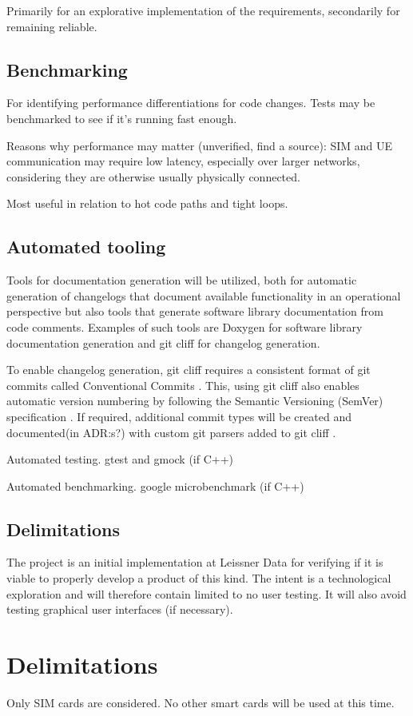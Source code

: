 Primarily for an explorative implementation of the requirements,
secondarily for remaining reliable.

\subsection{Benchmarking}

For identifying performance differentiations for code changes.
Tests may be benchmarked to see if it's running fast enough.

Reasons why performance may matter (unverified, find a source):
SIM and UE communication may require low latency, especially over
larger networks, considering they are otherwise usually
physically connected.

Most useful in relation to hot code paths and tight loops.

\subsection{Automated tooling}

Tools for documentation generation will be utilized, both for
automatic generation of changelogs that document available
functionality in an operational perspective but also tools that
generate software library documentation from code comments.
Examples of such tools are Doxygen \cite{doxygen} for software
library documentation generation and git cliff \cite{git-cliff} for
changelog generation.

To enable changelog generation, git cliff requires a consistent
format of git commits \cite{git-cliff} called Conventional Commits
\cite{conventional-commits}. This, using git cliff also enables
automatic version numbering \cite{git-cliff-bump-version} by
following the Semantic Versioning (SemVer) specification
\cite{semver}. If required, additional commit types will be created
and documented(in ADR:s?) with custom git parsers added to git cliff
\cite{git-cliff-tips-and-tricks}.

Automated testing.
gtest and gmock (if C++)

Automated benchmarking.
google microbenchmark (if C++)

\subsection{Delimitations}

The project is an initial implementation at Leissner Data for
verifying if it is viable to properly develop a product of this
kind. The intent is a technological exploration and will
therefore contain limited to no user testing. It will also avoid
testing graphical user interfaces (if necessary).

\section{Delimitations}

Only SIM cards are considered. No other smart cards will be used
at this time.
